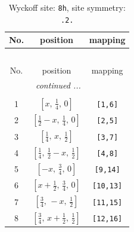 \documentclass[fleqn,8pt]{jsarticle}
\begin{document}
\begin{longtable}{ccc}
\caption{Wyckoff site: {\tt 8h}, site symmetry: {\tt .2.}}
 \\
 \hline \hline
No. & position & mapping \\ \hline \endfirsthead

\multicolumn{2}{l}{\tablename\ \thetable{}} \\
 \hline \hline
No. & position & mapping \\ \hline \endhead

 \hline \hline
\multicolumn{2}{r}{\footnotesize\it continued ...} \\ \endfoot

 \hline \hline
\multicolumn{2}{r}{} \\ \endlastfoot

1 & $\left[ x,\, \frac{1}{4},\, 0 \right]$ & {\tt [1,6]} \\ \hline
2 & $\left[ \frac{1}{2} - x,\, \frac{1}{4},\, 0 \right]$ & {\tt [2,5]} \\ \hline
3 & $\left[ \frac{1}{4},\, x,\, \frac{1}{2} \right]$ & {\tt [3,7]} \\ \hline
4 & $\left[ \frac{1}{4},\, \frac{1}{2} - x,\, \frac{1}{2} \right]$ & {\tt [4,8]} \\ \hline
5 & $\left[ - x,\, \frac{3}{4},\, 0 \right]$ & {\tt [9,14]} \\ \hline
6 & $\left[ x + \frac{1}{2},\, \frac{3}{4},\, 0 \right]$ & {\tt [10,13]} \\ \hline
7 & $\left[ \frac{3}{4},\, - x,\, \frac{1}{2} \right]$ & {\tt [11,15]} \\ \hline
8 & $\left[ \frac{3}{4},\, x + \frac{1}{2},\, \frac{1}{2} \right]$ & {\tt [12,16]} \\
\end{longtable}
\renewcommand{\arraystretch}{1.2}
\end{document}
